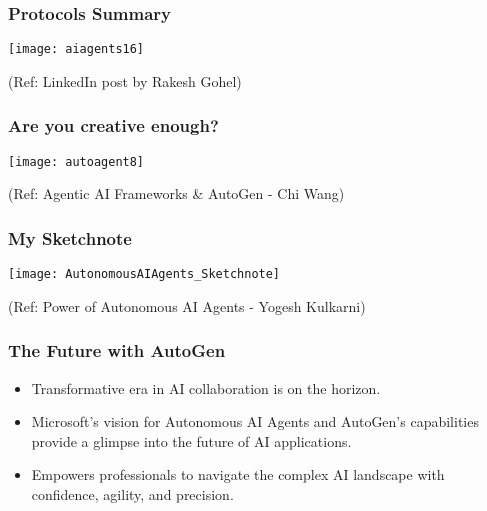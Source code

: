 \begin{frame}[fragile]\frametitle{Protocols Summary}
		\begin{center}
		\texttt{[image: aiagents16]}
		\end{center}
		
		{\tiny (Ref: LinkedIn post by Rakesh Gohel)}
\end{frame}
  

\begin{frame}[fragile]\frametitle{Are you creative enough?}
		\begin{center}
		\texttt{[image: autoagent8]}
		\end{center}
		
		{\tiny (Ref: Agentic AI Frameworks \& AutoGen - Chi Wang)}
\end{frame}
  

\begin{frame}[fragile]\frametitle{My Sketchnote}
	
	\begin{center}
	\texttt{[image: AutonomousAIAgents\_Sketchnote]}
	\end{center}
{\tiny (Ref: Power of Autonomous AI Agents - Yogesh Kulkarni)}
\end{frame}

\begin{frame}[fragile]\frametitle{The Future with AutoGen}
  \begin{itemize}
    \item Transformative era in AI collaboration is on the horizon.
    \item Microsoft's vision for Autonomous AI Agents and AutoGen's capabilities provide a glimpse into the future of AI applications.
    \item Empowers professionals to navigate the complex AI landscape with confidence, agility, and precision.
  \end{itemize}
\end{frame}

